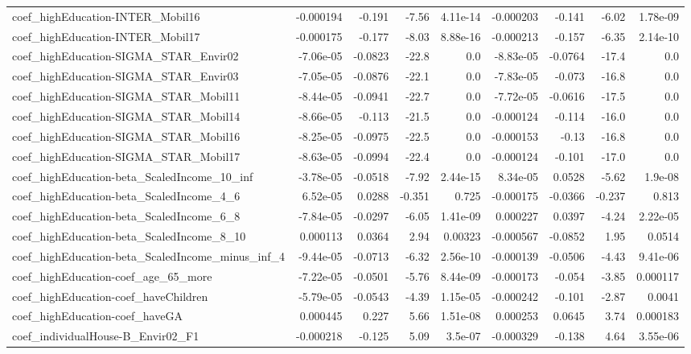 \begin{tabular}{lrrrrrrrr}
coef_highEducation-INTER_Mobil16 & -0.000194 & -0.191 & -7.56 & 4.11e-14 & -0.000203 & -0.141 & -6.02 & 1.78e-09 \\
coef_highEducation-INTER_Mobil17 & -0.000175 & -0.177 & -8.03 & 8.88e-16 & -0.000213 & -0.157 & -6.35 & 2.14e-10 \\
coef_highEducation-SIGMA_STAR_Envir02 & -7.06e-05 & -0.0823 & -22.8 & 0.0 & -8.83e-05 & -0.0764 & -17.4 & 0.0 \\
coef_highEducation-SIGMA_STAR_Envir03 & -7.05e-05 & -0.0876 & -22.1 & 0.0 & -7.83e-05 & -0.073 & -16.8 & 0.0 \\
coef_highEducation-SIGMA_STAR_Mobil11 & -8.44e-05 & -0.0941 & -22.7 & 0.0 & -7.72e-05 & -0.0616 & -17.5 & 0.0 \\
coef_highEducation-SIGMA_STAR_Mobil14 & -8.66e-05 & -0.113 & -21.5 & 0.0 & -0.000124 & -0.114 & -16.0 & 0.0 \\
coef_highEducation-SIGMA_STAR_Mobil16 & -8.25e-05 & -0.0975 & -22.5 & 0.0 & -0.000153 & -0.13 & -16.8 & 0.0 \\
coef_highEducation-SIGMA_STAR_Mobil17 & -8.63e-05 & -0.0994 & -22.4 & 0.0 & -0.000124 & -0.101 & -17.0 & 0.0 \\
coef_highEducation-beta_ScaledIncome_10_inf & -3.78e-05 & -0.0518 & -7.92 & 2.44e-15 & 8.34e-05 & 0.0528 & -5.62 & 1.9e-08 \\
coef_highEducation-beta_ScaledIncome_4_6 & 6.52e-05 & 0.0288 & -0.351 & 0.725 & -0.000175 & -0.0366 & -0.237 & 0.813 \\
coef_highEducation-beta_ScaledIncome_6_8 & -7.84e-05 & -0.0297 & -6.05 & 1.41e-09 & 0.000227 & 0.0397 & -4.24 & 2.22e-05 \\
coef_highEducation-beta_ScaledIncome_8_10 & 0.000113 & 0.0364 & 2.94 & 0.00323 & -0.000567 & -0.0852 & 1.95 & 0.0514 \\
coef_highEducation-beta_ScaledIncome_minus_inf_4 & -9.44e-05 & -0.0713 & -6.32 & 2.56e-10 & -0.000139 & -0.0506 & -4.43 & 9.41e-06 \\
coef_highEducation-coef_age_65_more & -7.22e-05 & -0.0501 & -5.76 & 8.44e-09 & -0.000173 & -0.054 & -3.85 & 0.000117 \\
coef_highEducation-coef_haveChildren & -5.79e-05 & -0.0543 & -4.39 & 1.15e-05 & -0.000242 & -0.101 & -2.87 & 0.0041 \\
coef_highEducation-coef_haveGA & 0.000445 & 0.227 & 5.66 & 1.51e-08 & 0.000253 & 0.0645 & 3.74 & 0.000183 \\
coef_individualHouse-B_Envir02_F1 & -0.000218 & -0.125 & 5.09 & 3.5e-07 & -0.000329 & -0.138 & 4.64 & 3.55e-06 \\

\end{tabular}
